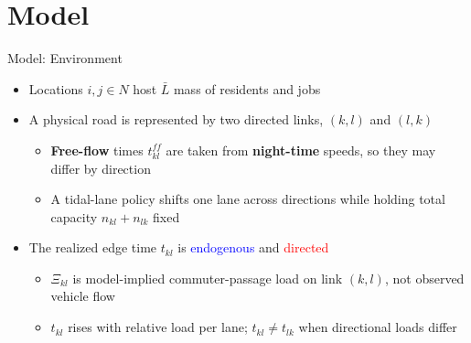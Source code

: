 \documentclass[11pt,aspectratio=169]{beamer}
\begin{document}
\section{Model}

\begin{frame}{Model: Environment}
\begin{itemize}
  \item Locations $i,j\in N$ host $\bar{L}$ mass of residents and jobs
  \vspace{0.5em}
  \item A physical road is represented by two directed links, $(k,l)$ and $(l,k)$
  \begin{itemize}
    \item \textbf{Free-flow} times $t_{kl}^{ff}$ are taken from \textbf{night-time} speeds, so they may differ by direction
    \item A tidal-lane policy shifts one lane across directions while holding total capacity $n_{kl}+n_{lk}$ fixed
  \end{itemize}
  \vspace{0.5em}
  \item The realized edge time $t_{kl}$ is \textcolor{blue}{endogenous} and \textcolor{red}{directed}
  \begin{itemize}
    \item $\Xi_{kl}$ is model-implied commuter-passage load on link $(k,l)$, not observed vehicle flow
    \item $t_{kl}$ rises with relative load per lane; $t_{kl} \neq t_{lk}$ when directional loads differ
  \end{itemize}
\end{itemize}
\end{frame}
\end{document}
